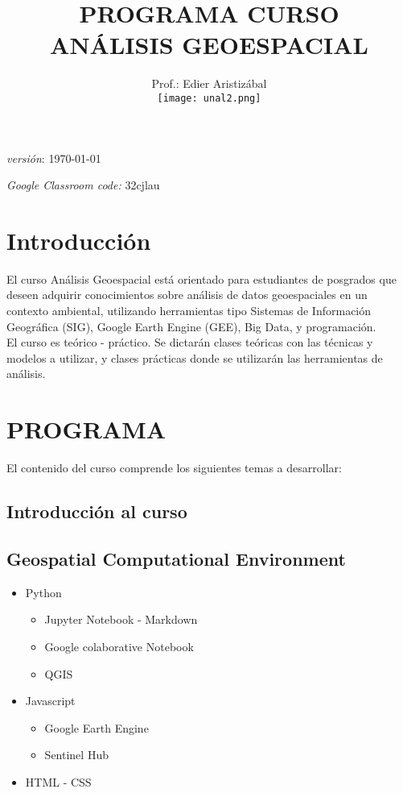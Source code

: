 \documentclass[a4paper,twoside,11pt,]{article}
\title {PROGRAMA  CURSO\\ ANÁLISIS GEOESPACIAL}
\author{Prof.: Edier Aristizábal\\[5ex]
\texttt{[image: unal2.png]}
}
\date{}
\begin{document}
\maketitle

\emph {versión}: \today

\emph {Google Classroom code:} 32cjlau

\section* {Introducción}
El curso Análisis Geoespacial está orientado para estudiantes de posgrados que deseen adquirir conocimientos sobre análisis de datos geoespaciales en un contexto ambiental, utilizando herramientas tipo Sistemas de Información Geográfica (SIG), Google Earth Engine (GEE), Big Data, y programación.\\
El curso es teórico - práctico. Se dictarán clases teóricas con las técnicas y modelos a utilizar, y clases prácticas donde se utilizarán las herramientas de análisis. 

\section{PROGRAMA}
El contenido del curso comprende los siguientes temas a desarrollar:

\subsection*{Introducción al curso}

\subsection {Geospatial Computational Environment}
\begin{itemize}
    \item Python
   \begin{itemize}
    \item Jupyter Notebook - Markdown
    \item Google colaborative Notebook
    \item QGIS
   \end{itemize}
    \item Javascript
    \begin{itemize}
        \item Google Earth Engine
        \item Sentinel Hub
    \end{itemize}
    \item HTML - CSS
\end{itemize}
\end{document}
